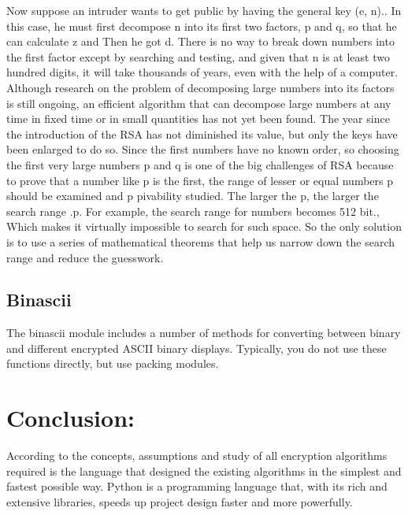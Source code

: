 \begin{flushleft}
Now suppose an intruder wants to get public by having the general key (e, n).. In this case, he must first decompose n into its first two factors, p and q, so that he can calculate z and Then he got d. There is no way to break down numbers into the first factor except by searching and testing, and given that n is at least two hundred digits, it will take thousands of years, even with the help of a computer.
Although research on the problem of decomposing large numbers into its factors is still ongoing, an efficient algorithm that can decompose large numbers at any time in fixed time or in small quantities has not yet been found. The year since the introduction of the RSA has not diminished its value, but only the keys have been enlarged to do so.
Since the first numbers have no known order, so choosing the first very large numbers p and q is one of the big challenges of RSA because to prove that a number like p is the first, the range of lesser or equal numbers p should be examined and p pivability studied.
The larger the p, the larger the search range .p. For example, the search range for numbers becomes 512 bit., Which makes it virtually impossible to search for such space. So the only solution is to use a series of mathematical theorems that help us narrow down the search range and reduce the guesswork.
\subsection{Binascii}
The binascii module includes a number of methods for converting between binary and different encrypted ASCII binary displays. Typically, you do not use these functions directly, but use packing modules.
\section{Conclusion:
}
According to the concepts, assumptions and study of all encryption algorithms required is the language that designed the existing algorithms in the simplest and fastest possible way. Python is a programming language that, with its rich and extensive libraries, speeds up project design faster and more powerfully.
\end{flushleft}
